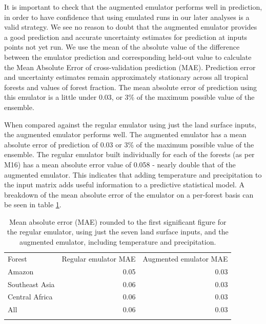 \documentclass[gmd, manuscript]{copernicus}
\begin{document}
It is important to check that the augmented emulator performs well in prediction, in order to have confidence that using emulated runs in our later analyses is a valid strategy. We see no reason to doubt that the augmented emulator provides a good prediction and accurate uncertainty estimates for prediction at inputs points not yet run. We use the mean of the absolute value of the difference between the emulator prediction and corresponding held-out value to calculate the Mean Absolute Error of cross-validation prediction (MAE). Prediction error and uncertainty estimates remain approximately stationary across all tropical forests and values of forest fraction. The mean absolute error of prediction using this emulator is a little under 0.03, or 3\% of the maximum possible value of the ensemble.

When compared against the regular emulator using just the land surface inputs, the augmented emulator performs well. The augmented emulator has a mean absolute error of prediction of 0.03 or 3\% of the maximum possible value of the ensemble. The regular emulator built individually for each of the forests (as per M16) has a mean absolute error value of 0.058 - nearly double that of the augmented emulator. This indicates that adding temperature and precipitation to the input matrix adds useful information to a predictive statistical model. A breakdown of the mean absolute error of the emulator on a per-forest basis can be seen in table \ref{tab:mae}.



\begin{table}[t]
\caption{Mean absolute error (MAE) rounded to the first significant figure for the regular emulator, using just the seven land surface inputs, and the augmented emulator, including temperature and precipitation.}
\begin{tabular}{lrr}
\tophline

Forest                & Regular emulator MAE & Augmented emulator MAE \\
\middlehline
Amazon              & 0.05                              & 0.03                                     \\
Southeast Asia  & 0.06                               & 0.03                                    \\
Central Africa    & 0.06                               & 0.03                                      \\
All                      & 0.06                              & 0.03                                       \\

\bottomhline
\end{tabular}
\belowtable{} %
\label{tab:mae}
\end{table}
\end{document}

